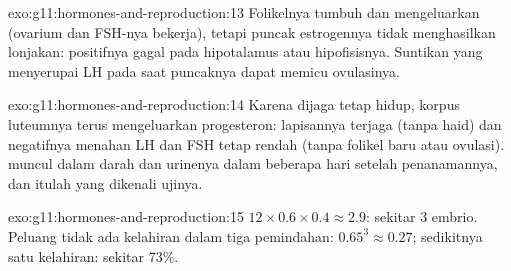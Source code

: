 \begin{solution}{exo:g11:hormones-and-reproduction:13}
Folikelnya tumbuh dan mengeluarkan  (ovarium dan FSH-nya
bekerja), tetapi puncak estrogennya tidak menghasilkan lonjakan:  positifnya gagal pada hipotalamus atau hipofisisnya. Suntikan
 yang menyerupai LH pada saat puncaknya dapat memicu ovulasinya.
\end{solution}

\begin{solution}{exo:g11:hormones-and-reproduction:14}
Karena dijaga tetap hidup, korpus luteumnya terus mengeluarkan
progesteron: lapisannya terjaga (tanpa haid) dan  negatifnya
menahan LH dan FSH tetap rendah (tanpa folikel baru atau ovulasi).
 muncul dalam darah dan urinenya dalam beberapa hari setelah
penanamannya, dan itulah yang dikenali ujinya.
\end{solution}

\begin{solution}{exo:g11:hormones-and-reproduction:15}
$12 \times 0.6 \times 0.4 \approx 2.9$: sekitar 3 embrio. Peluang tidak
ada kelahiran dalam tiga pemindahan: $0.65^3 \approx 0.27$; sedikitnya
satu kelahiran: sekitar 73\%.
\end{solution}

